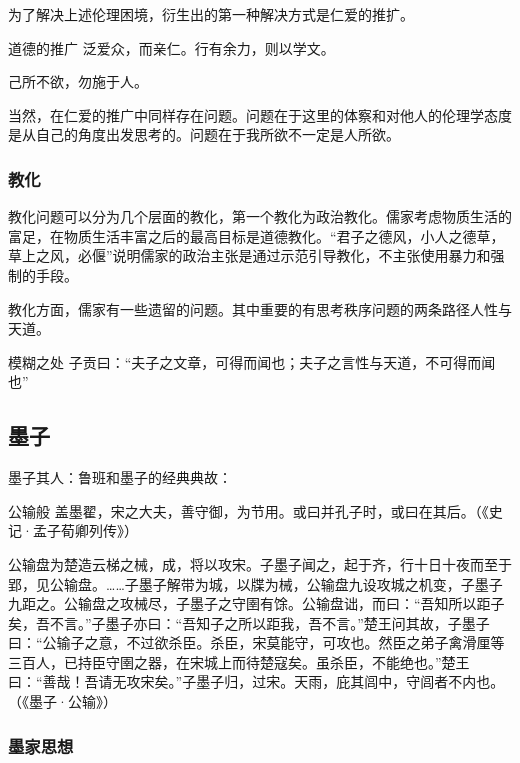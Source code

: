 \documentclass{ctexart}
\begin{document}
为了解决上述伦理困境，衍生出的第一种解决方式是仁爱的推扩。

\begin{fancybox}{道德的推广}
    泛爱众，而亲仁。行有余力，则以学文。

    己所不欲，勿施于人。
\end{fancybox}

当然，在仁爱的推广中同样存在问题。问题在于这里的体察和对他人的伦理学态度是从自己的角度出发思考的。问题在于我所欲不一定是人所欲。

\subsubsection{教化}

教化问题可以分为几个层面的教化，第一个教化为政治教化。儒家考虑物质生活的富足，在物质生活丰富之后的最高目标是道德教化。“君子之德风，小人之德草，草上之风，必偃”说明儒家的政治主张是通过示范引导教化，不主张使用暴力和强制的手段。

教化方面，儒家有一些遗留的问题。其中重要的有思考秩序问题的两条路径人性与天道。

\begin{fancybox}{模糊之处}
    子贡曰：“夫子之文章，可得而闻也；夫子之言性与天道，不可得而闻也”
\end{fancybox}

\subsection{墨子}

墨子其人：鲁班和墨子的经典典故：

\begin{fancybox}{公输般}
    盖墨翟，宋之大夫，善守御，为节用。或曰并孔子时，或曰在其后。（《史记·孟子荀卿列传》）

    公输盘为楚造云梯之械，成，将以攻宋。子墨子闻之，起于齐，行十日十夜而至于郢，见公输盘。……子墨子解带为城，以牒为械，公输盘九设攻城之机变，子墨子九距之。公输盘之攻械尽，子墨子之守圉有馀。公输盘诎，而曰：“吾知所以距子矣，吾不言。”子墨子亦曰：“吾知子之所以距我，吾不言。”楚王问其故，子墨子曰：“公输子之意，不过欲杀臣。杀臣，宋莫能守，可攻也。然臣之弟子禽滑厘等三百人，已持臣守圉之器，在宋城上而待楚寇矣。虽杀臣，不能绝也。”楚王曰：“善哉！吾请无攻宋矣。”子墨子归，过宋。天雨，庇其闾中，守闾者不内也。（《墨子·公输》）
\end{fancybox}

\subsubsection{墨家思想}
\end{document}
